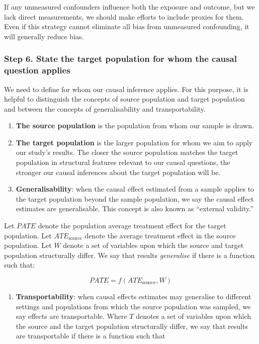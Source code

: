 \documentclass[
  singlecolumn,
  9pt]{article}
\providecommand{\tightlist}{%
  \setlength{\itemsep}{0pt}\setlength{\parskip}{0pt}}\usepackage{longtable,booktabs,array}
\begin{document}
If any unmeasured confounders influence both the exposure and outcome,
but we lack direct measurements, we should make efforts to include
proxies for them. Even if this strategy cannot eliminate all bias from
unmeasured confounding, it will generally reduce bias.

\subsubsection{Step 6. State the target population for whom the causal
question
applies}\label{step-6.-state-the-target-population-for-whom-the-causal-question-applies}

We need to define for whom our causal inference applies. For this
purpose, it is helpful to distinguish the concepts of source population
and target population and between the concepts of generalisability and
transportability.

\begin{enumerate}
\def\labelenumi{\arabic{enumi}.}
\item
  \textbf{The source population} is the population from whom our sample
  is drawn.
\item
  \textbf{The target population} is the larger population for whom we
  aim to apply our study's results. The closer the source population
  matches the target population in structural features relevant to our
  causal questions, the stronger our causal inferences about the target
  population will be.
\item
  \textbf{Generalisability}: when the causal effect estimated from a
  sample applies to the target population beyond the sample population,
  we say the causal effect estimates are generalisable. This concept is
  also known as ``external validity.''
\end{enumerate}

Let \(PATE\) denote the population average treatment effect for the
target population. Let \(ATE_{\text{source}}\) denote the average
treatment effect in the source population. Let \(W\) denote a set of
variables upon which the source and target population structurally
differ. We say that results \emph{generalise} if there is a function
such that:

\[PATE =  f(ATE_{\text{source}}, W)\]

\begin{enumerate}
\def\labelenumi{\arabic{enumi}.}
\setcounter{enumi}{3}
\tightlist
\item
  \textbf{Transportability}: when causal effects estimates may
  generalise to different settings and populations from which the source
  population was sampled, we say effects are transportable. Where \(T\)
  denotes a set of variables upon which the source and the target
  population structurally differ, we say that results are transportable
  if there is a function such that
\end{enumerate}
\end{document}
